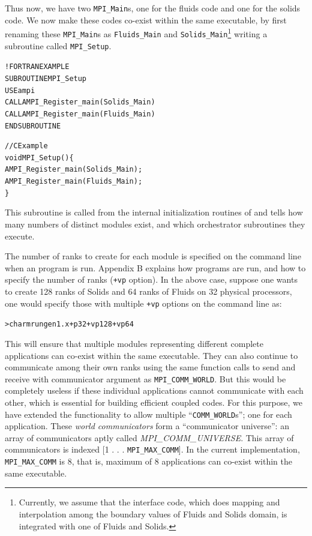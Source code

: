 \documentclass[10pt]{article}
\begin{document}
Thus now, we have two \texttt{MPI\_Main}s, one for the fluids code and one for
the solids code. We now make these codes co-exist within the same executable,
by first renaming these \texttt{MPI\_Main}s as \texttt{Fluids\_Main} and
\texttt{Solids\_Main}\footnote{Currently, we assume that the interface code,
which does mapping and interpolation among the boundary values of Fluids and
Solids domain, is integrated with one of Fluids and Solids.} writing a
subroutine called \texttt{MPI\_Setup}.

\begin{alltt}
!FORTRAN EXAMPLE
SUBROUTINE MPI_Setup
  USE ampi
  CALL AMPI_Register_main(Solids_Main)
  CALL AMPI_Register_main(Fluids_Main)
END SUBROUTINE

//C Example
void MPI_Setup()\{
  AMPI_Register_main(Solids_Main);
  AMPI_Register_main(Fluids_Main);
\}
\end{alltt}

This subroutine is called from the internal initialization routines of \ampi{}
and tells \ampi{} how many numbers of distinct modules exist, and
which orchestrator subroutines they execute.

The number of ranks to create for each module is specified on the command
line when an \ampi{} program is run. Appendix B explains how \ampi{} programs
are run, and how to specify the number of ranks (\verb|+vp| option). In the
above case, suppose one wants to create 128 ranks of Solids and 64 ranks of
Fluids on 32 physical processors, one would specify those with multiple
\verb|+vp| options on the command line as:

\begin{alltt}
> charmrun gen1.x +p 32 +vp 128 +vp 64
\end{alltt}

This will ensure that multiple modules representing different complete
applications can co-exist within the same executable. They can also continue to
communicate among their own ranks using the same \ampi{} function calls
to send and receive with communicator argument as \texttt{MPI\_COMM\_WORLD}.
But this would be completely useless if these individual applications cannot
communicate with each other, which is essential for building efficient coupled
codes.  For this purpose, we have extended the \ampi{} functionality to allow
multiple ``\texttt{COMM\_WORLD}s''; one for each application. These \emph{world
communicators} form a ``communicator universe'': an array of communicators
aptly called \emph{MPI\_COMM\_UNIVERSE}. This array of communicators is 
indexed [1 . . . \texttt{MPI\_MAX\_COMM}]. In the current implementation,
\texttt{MPI\_MAX\_COMM} is 8, that is, maximum of 8 applications can co-exist
within the same executable.
\end{document}
